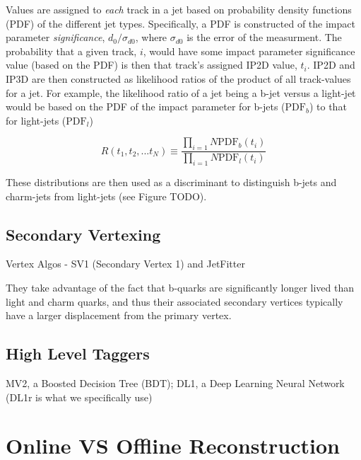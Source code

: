             Values are assigned to \textit{each} track in a jet based on probability density functions (PDF) of the different jet types.
            Specifically, a PDF is constructed of the impact parameter \textit{significance}, $d_0/\sigma_{d0}$,
                where $\sigma_{d0}$ is the error of the measurment.
            The probability that a given track, $i$, would have some impact parameter significance value (based on the PDF)
                is then that track's assigned IP2D value, $t_i$.
            IP2D and IP3D are then constructed as likelihood ratios of the product of all track-values for a jet.
            For example, the likelihood ratio of a jet being a b-jet versus a light-jet would be based on
                the PDF of the impact parameter for b-jets ($\textrm{PDF}_b$) to that for light-jets ($\textrm{PDF}_l$)

            \begin{equation}
                R(t_1, t_2, ... t_N) \equiv \frac{\prod_{i=1}{N} \textrm{PDF}_b(t_i)}{\prod_{i=1}{N} \textrm{PDF}_l(t_i)}
            \end{equation}

            These distributions are then used as a discriminant to distinguish b-jets and charm-jets from light-jets
                (see Figure TODO)\cite{thesis_giacinto}. %

        \subsection{Secondary Vertexing}

            Vertex Algos - SV1 (Secondary Vertex 1) and JetFitter

            They take advantage of the fact that b-quarks are significantly longer lived than light and charm quarks,
                and thus their associated secondary vertices typically have a larger displacement from the primary vertex.

        \subsection{High Level Taggers}

            MV2, a Boosted Decision Tree (BDT);
            DL1, a Deep Learning Neural Network (DL1r is what we specifically use)
            \cite{bjet_id_and_performance}
            \cite{btagging_optimisation}

    \section{Online VS Offline Reconstruction}

